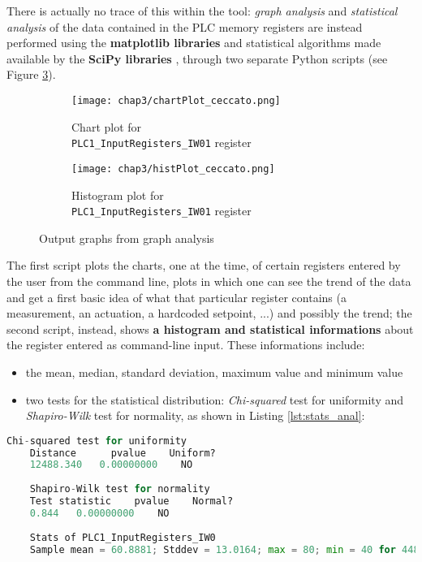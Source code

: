 \bigskip
There is actually no trace of this within the tool: \textit{graph analysis} and \textit{statistical analysis} of the data contained in the PLC memory registers are instead performed using the \textbf{matplotlib libraries} and statistical algorithms made available by the \textbf{SciPy libraries} \cite{scipy}, through two separate Python scripts (see Figure \ref{fig:ceccato_graphs}).

\begin{figure}[ht]
	\centering
	\begin{subfigure}{0.48\textwidth}
		\texttt{[image: chap3/chartPlot\_ceccato.png]}
		\caption{Chart plot for\\ \texttt{PLC1\_InputRegisters\_IW01} register}
		\label{subfig:chart_plot_ceccato}
	\end{subfigure}
	\hfill
	\begin{subfigure}{0.48\textwidth}
		\texttt{[image: chap3/histPlot\_ceccato.png]}
		\caption{Histogram plot for\\ \texttt{PLC1\_InputRegisters\_IW01} register}
		\label{subfig:hist_plot_ceccato}
	\end{subfigure}
	\caption{Output graphs from graph analysis}
	\label{fig:ceccato_graphs}
\end{figure}

The first script plots the charts, one at the time, of certain registers entered by the user from the command line, plots in which one can see the trend of the data and get a first basic idea of what that particular register contains (a measurement, an actuation, a hardcoded setpoint, ...) and possibly the trend; the second script, instead, shows \textbf{a histogram and statistical informations} about the register entered as command-line input. These informations include:

\begin{itemize}
	\item the mean, median, standard deviation, maximum value and minimum value
	
	\item two tests for the statistical distribution: \textit{Chi-squared} test for uniformity and \textit{Shapiro-Wilk} test for normality, as shown in Listing \ref{lst:stats_anal}:

\end{itemize}

\begin{lstlisting}[language=Python,numbers=none,caption={Statistical data for PLC1\_InputRegisters\_IW0 register},label=lst:stats_anal]
	Chi-squared test for uniformity
	Distance      pvalue    Uniform?
	12488.340   0.00000000    NO    
	
	Shapiro-Wilk test for normality
	Test statistic    pvalue    Normal? 
	0.844   0.00000000    NO    
	
	Stats of PLC1_InputRegisters_IW0
	Sample mean = 60.8881; Stddev = 13.0164; max = 80; min = 40 for 4488 values
\end{lstlisting}

